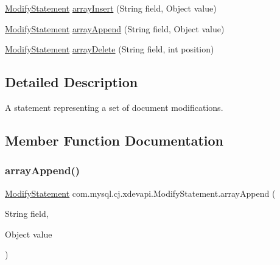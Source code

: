 \begin{DoxyCompactItemize}
\item 
\mbox{\hyperlink{interfacecom_1_1mysql_1_1cj_1_1xdevapi_1_1_modify_statement}{Modify\+Statement}} \mbox{\hyperlink{interfacecom_1_1mysql_1_1cj_1_1xdevapi_1_1_modify_statement_ac2c03d79835985d8b8771aee0945aea8}{array\+Insert}} (String field, Object value)
\item 
\mbox{\hyperlink{interfacecom_1_1mysql_1_1cj_1_1xdevapi_1_1_modify_statement}{Modify\+Statement}} \mbox{\hyperlink{interfacecom_1_1mysql_1_1cj_1_1xdevapi_1_1_modify_statement_a236afae470efde69f0276fe532b16f52}{array\+Append}} (String field, Object value)
\item 
\mbox{\hyperlink{interfacecom_1_1mysql_1_1cj_1_1xdevapi_1_1_modify_statement}{Modify\+Statement}} \mbox{\hyperlink{interfacecom_1_1mysql_1_1cj_1_1xdevapi_1_1_modify_statement_ab65173595a82dfa001a5217896e73cfc}{array\+Delete}} (String field, int position)
\end{DoxyCompactItemize}


\subsection{Detailed Description}
A statement representing a set of document modifications. 

\subsection{Member Function Documentation}
\mbox{\label{interfacecom_1_1mysql_1_1cj_1_1xdevapi_1_1_modify_statement_a236afae470efde69f0276fe532b16f52}} 
\subsubsection{\texorpdfstring{array\+Append()}{arrayAppend()}}
{\footnotesize\ttfamily \mbox{\hyperlink{interfacecom_1_1mysql_1_1cj_1_1xdevapi_1_1_modify_statement}{Modify\+Statement}} com.\+mysql.\+cj.\+xdevapi.\+Modify\+Statement.\+array\+Append (\begin{DoxyParamCaption}\item[{String}]{field,  }\item[{Object}]{value }\end{DoxyParamCaption})}

